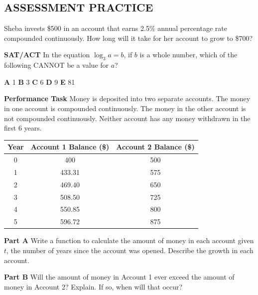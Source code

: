 \documentclass{article}
\newenvironment{practice}[2]{}{}
\begin{document}
\subsection*{ASSESSMENT PRACTICE}

\begin{practice}{56}{?}
Sheba invests \$500 in an account that earns 2.5\% annual percentage rate compounded continuously. How long will it take for her account to grow to \$700?
\end{practice}

\begin{practice}{57}{?}
\textbf{SAT/ACT} In the equation $\log_3 a = b$, if $b$ is a whole number, which of the following CANNOT be a value for $a$?

\textbf{A} 1 \qquad \textbf{B} 3 \qquad \textbf{C} 6 \qquad \textbf{D} 9 \qquad \textbf{E} 81
\end{practice}

\begin{practice}{58}{?}
\textbf{Performance Task} Money is deposited into two separate accounts. The money in one account is compounded continuously. The money in the other account is not compounded continuously. Neither account has any money withdrawn in the first 6 years.

\begin{tabular}{|c|c|c|}
\hline
\textbf{Year} & \textbf{Account 1 Balance (\$)} & \textbf{Account 2 Balance (\$)} \\
\hline
0 & 400 & 500 \\
1 & 433.31 & 575 \\
2 & 469.40 & 650 \\
3 & 508.50 & 725 \\
4 & 550.85 & 800 \\
5 & 596.72 & 875 \\
\hline
\end{tabular}

\textbf{Part A} Write a function to calculate the amount of money in each account given $t$, the number of years since the account was opened. Describe the growth in each account.

\textbf{Part B} Will the amount of money in Account 1 ever exceed the amount of money in Account 2? Explain. If so, when will that occur?
\end{practice}
\end{document}
